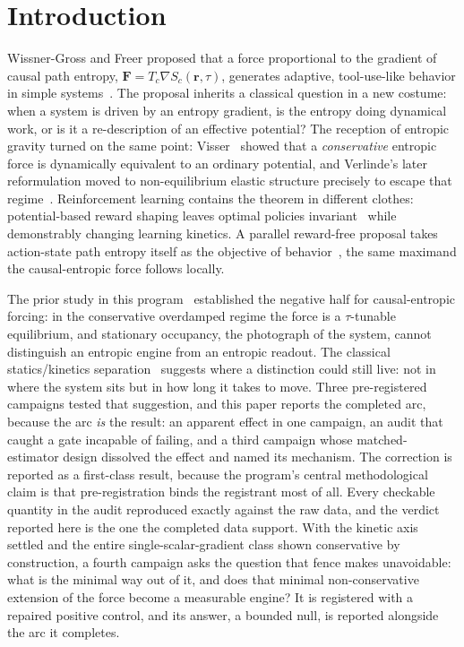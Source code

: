 \documentclass[11pt]{article}
\begin{document}
\section{Introduction}

Wissner-Gross and Freer proposed that a force proportional to the gradient of causal path entropy, $\mathbf{F} = T_c \nabla S_c(\mathbf{r}, \tau)$, generates adaptive, tool-use-like behavior in simple systems~\cite{wgf}. The proposal inherits a classical question in a new costume: when a system is driven by an entropy gradient, is the entropy doing dynamical work, or is it a re-description of an effective potential? The reception of entropic gravity turned on the same point: Visser~\cite{visser} showed that a \emph{conservative} entropic force is dynamically equivalent to an ordinary potential, and Verlinde's later reformulation moved to non-equilibrium elastic structure precisely to escape that regime~\cite{verlinde2011,verlinde2017}. Reinforcement learning contains the theorem in different clothes: potential-based reward shaping leaves optimal policies invariant~\cite{ngharada,jenner} while demonstrably changing learning kinetics. A parallel reward-free proposal takes action-state path entropy itself as the objective of behavior~\cite{mop}, the same maximand the causal-entropic force follows locally.

The prior study in this program~\cite{v3} established the negative half for causal-entropic forcing: in the conservative overdamped regime the force is a $\tau$-tunable equilibrium, and stationary occupancy, the photograph of the system, cannot distinguish an entropic engine from an entropic readout. The classical statics/kinetics separation~\cite{htb,kramers} suggests where a distinction could still live: not in where the system sits but in how long it takes to move. Three pre-registered campaigns tested that suggestion, and this paper reports the completed arc, because the arc \emph{is} the result: an apparent effect in one campaign, an audit that caught a gate incapable of failing, and a third campaign whose matched-estimator design dissolved the effect and named its mechanism. The correction is reported as a first-class result, because the program's central methodological claim is that pre-registration binds the registrant most of all. Every checkable quantity in the audit reproduced exactly against the raw data, and the verdict reported here is the one the completed data support. With the kinetic axis settled and the entire single-scalar-gradient class shown conservative by construction, a fourth campaign asks the question that fence makes unavoidable: what is the minimal way out of it, and does that minimal non-conservative extension of the force become a measurable engine? It is registered with a repaired positive control, and its answer, a bounded null, is reported alongside the arc it completes.
\end{document}
